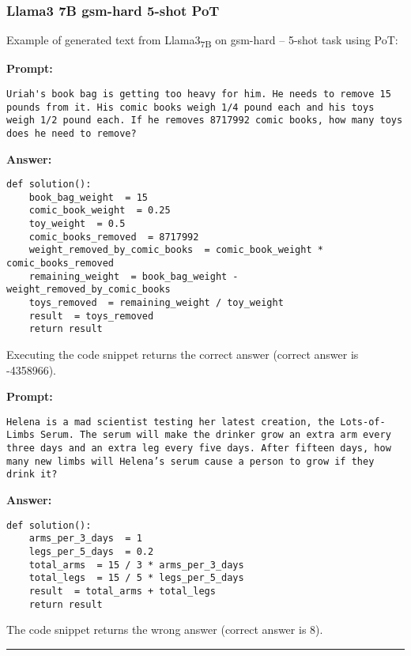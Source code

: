 	\subsubsection*{Llama3 7B gsm-hard 5-shot PoT}
	\noindent Example of generated text from Llama3\textsubscript{7B} on gsm-hard -- 5-shot task using PoT:
	\begin{displayquote}
		\textbf{Prompt:}
		\begin{Verbatim}[fontsize=\small,breaklines]
Uriah's book bag is getting too heavy for him. He needs to remove 15 pounds from it. His comic books weigh 1/4 pound each and his toys weigh 1/2 pound each. If he removes 8717992 comic books, how many toys does he need to remove?
	\end{Verbatim}
		\textbf{Answer:}
		\begin{Verbatim}[fontsize=\small,breaklines]
def solution():
    book_bag_weight  = 15
    comic_book_weight  = 0.25
    toy_weight  = 0.5
    comic_books_removed  = 8717992
    weight_removed_by_comic_books  = comic_book_weight * comic_books_removed
    remaining_weight  = book_bag_weight - weight_removed_by_comic_books
    toys_removed  = remaining_weight / toy_weight
    result  = toys_removed
    return result
	\end{Verbatim}
	\end{displayquote}
	Executing the code snippet returns the correct answer (correct answer is -4358966).
	\begin{displayquote}
		\textbf{Prompt:}
		\begin{Verbatim}[fontsize=\small,breaklines]
Helena is a mad scientist testing her latest creation, the Lots-of-Limbs Serum. The serum will make the drinker grow an extra arm every three days and an extra leg every five days. After fifteen days, how many new limbs will Helena’s serum cause a person to grow if they drink it?
	\end{Verbatim}
		\textbf{Answer:}
		\begin{Verbatim}[fontsize=\small,breaklines]
def solution():
    arms_per_3_days  = 1
    legs_per_5_days  = 0.2
    total_arms  = 15 / 3 * arms_per_3_days
    total_legs  = 15 / 5 * legs_per_5_days
    result  = total_arms + total_legs
    return result
	\end{Verbatim}
	\end{displayquote}
	The code snippet returns the wrong answer (correct answer is 8).

	\noindent\rule{\textwidth}{0.4pt}

